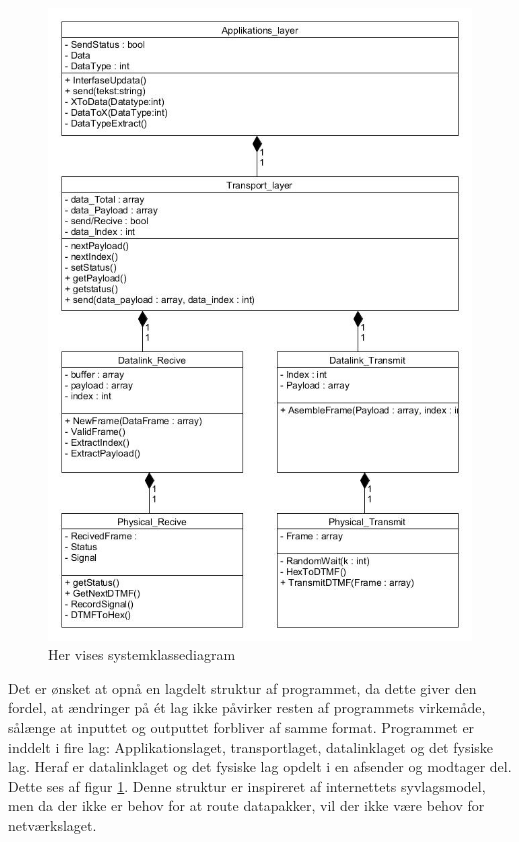 \begin{figure}[h]
\centering
\includegraphics[scale=0.45]{Billeder/Klassediagram_v1.jpg}
\caption{Her vises systemklassediagram}
\label{fig:Klassediagram_v1}
\end{figure}

Det er ønsket at opnå en lagdelt struktur af programmet, da dette giver den fordel, at ændringer på ét lag ikke påvirker resten af programmets virkemåde, sålænge at inputtet og outputtet forbliver af samme format. Programmet er inddelt i fire lag:  Applikationslaget, transportlaget, datalinklaget og det fysiske lag. Heraf er datalinklaget og det fysiske lag opdelt i en afsender og modtager del. Dette ses af figur \ref{fig:Klassediagram_v1}. Denne struktur er inspireret af internettets syvlagsmodel, men da der ikke er behov for at route datapakker, vil der ikke være behov for netværkslaget.

